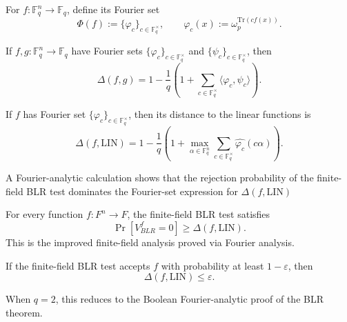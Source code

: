 \begin{definition}
    \label{def:ff-fourier-set}
    For $f : \mathbb{F}_q^n \to \mathbb{F}_q$, define its Fourier set
  \[
    \Phi(f) := \{\varphi_c\}_{c \in \mathbb{F}_q^\times},
    \qquad
    \varphi_c(x) := \omega_p^{\mathrm{Tr}(c f(x))}.
  \]
\end{definition}

\begin{lemma}
    \label{lem:ff-distance-formula}
If $f,g : \mathbb{F}_q^n \to \mathbb{F}_q$ have Fourier sets
  $\{\varphi_c\}_{c \in \mathbb{F}_q^\times}$ and
  $\{\psi_c\}_{c \in \mathbb{F}_q^\times}$, then
  \[
    \Delta(f,g)
    = 1 - \frac{1}{q}\left(1 + \sum_{c \in \mathbb{F}_q^\times}
      \langle \varphi_c,\psi_c\rangle\right).
  \]
\end{lemma}

\begin{lemma}
    \label{lem:ff-distance-to-linearity}
    If $f$ has Fourier set $\{\varphi_c\}_{c \in \mathbb{F}_q^\times}$,
  then its distance to the linear functions is
  \[
    \Delta(f,\mathrm{LIN})
    = 1 - \frac{1}{q}\left(1 + \max_{\alpha \in \mathbb{F}_q^n}
      \sum_{c \in \mathbb{F}_q^\times} \widehat{\varphi_c}(c\alpha)\right).
  \]
\end{lemma}

\begin{lemma}
    \label{lem:ff-spectral-bound}
A Fourier-analytic calculation shows that the rejection probability
  of the finite-field BLR test dominates the Fourier-set expression for
  $\Delta(f,\mathrm{LIN})$
\end{lemma}

\begin{lemma}
    \label{thm:ff-blr-improved-analysis}
For every function $f : F^n \to F$, the finite-field BLR test
  satisfies
  \[
    \Pr[V_{BLR}^f = 0] \ge \Delta(f,\mathrm{LIN}).
  \]
  This is the improved finite-field analysis proved via Fourier analysis.
\end{lemma}

\begin{lemma}
    \label{cor:ff-high-acceptance-close-to-linear}
If the finite-field BLR test accepts $f$ with probability at least
  $1 - \varepsilon$, then
  \[
    \Delta(f,\mathrm{LIN}) \le \varepsilon.
  \]
\end{lemma}

\begin{lemma}
    \label{rem:q2-special-case}
    When $q = 2$, this reduces to the Boolean Fourier-analytic proof
  of the BLR theorem.
\end{lemma}